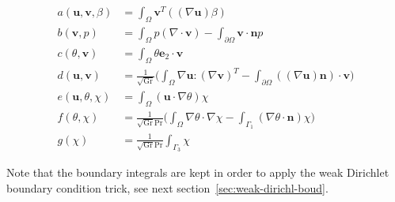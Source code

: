   \begin{equation}
    \label{notes:eq:26}
    \begin{array}{rl}
    a(\mathbf{u},\mathbf{v},\beta) &= \int_\Omega \mathbf{v}^T ((\nabla \mathbf{u} )\beta)\\
    b(\mathbf{v},p) &= \int_\Omega p (\nabla \cdot \mathbf{v}) - \int_{\partial \Omega} \mathbf{v}\cdot\mathbf{n} p\\
      c(\theta,\mathbf{v})&= \int_\Omega \theta \mathbf{e}_2 \cdot \mathbf{v}\\
      d(\mathbf{u},\mathbf{v}) &= \frac{1}{\sqrt{\mathrm{Gr}}} \Big(\int_\Omega \nabla \mathbf{u} \colon (\nabla \mathbf{v})^T - \int_{\partial \Omega} ((\nabla \mathbf{u}) \mathbf{n})\cdot \mathbf{v}\Big)\\
      e(\mathbf{u},\theta,\chi) &= \int_\Omega (\mathbf{u}\cdot \nabla \theta) \chi \\
      f(\theta,\chi) &=\frac{1}{\sqrt{\mathrm{Gr}}\mathrm{Pr}} \Big( \int_\Omega \nabla \theta \cdot \nabla \chi - \int_{\Gamma_1} (\nabla \theta \cdot \mathbf{n} ) \chi \Big)\\
      g(\chi) &=\frac{1}{\sqrt{\mathrm{Gr}}\mathrm{Pr}} \int_{\Gamma_3} \chi
    \end{array}
  \end{equation}
  \begin{remark}
    Note that the boundary integrals are kept in order to apply the
    weak Dirichlet boundary condition trick, see next section~\ref{sec:weak-dirichl-boud}.
  \end{remark}

